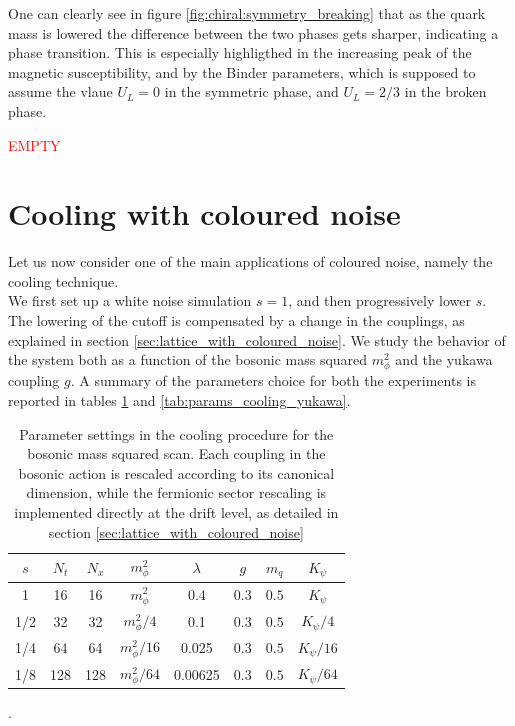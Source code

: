 One can clearly see in figure \ref{fig:chiral:symmetry_breaking} that as the quark  mass is lowered the difference between the two phases gets sharper, indicating a phase transition. 
This is especially highligthed in the increasing peak of the magnetic susceptibility, and by the Binder parameters, which is supposed to assume the vlaue $U_L = 0$ in the symmetric phase, and $U_L=2/3$ in the broken phase.

\newpage
\textcolor{red}{EMPTY}
\newpage

\section{Cooling with coloured noise}
Let us now consider one of the main applications of coloured noise, namely the cooling technique. \\
We first set up a white noise simulation $s=1$, and then progressively lower $s$. The lowering of the cutoff is compensated by a change in the couplings, as explained in section \ref{sec:lattice_with_coloured_noise}. 
We study the behavior of the system both as a function of the bosonic mass squared $m_\phi^2$ and the yukawa coupling $g$. 
A summary of the parameters choice for both the experiments is reported in tables \ref{tab:params_cooling} and \ref{tab:params_cooling_yukawa}. \\
\begin{table}[htp]
    \centering
    \begin{tabular}{cccccccc}
        \toprule
        $s$ & $N_t$ & $N_x$ & $m_\phi^2$ & $\lambda$ & $g$ & $m_q$& $K_\psi$ \\
        \midrule 
        1 & 16 & 16 & $m_\phi^2$ & 0.4 & 0.3 & $0.5$ & $K_\psi$ \\
        1/2 & 32 & 32 & $m_\phi^2/4$ & 0.1 & 0.3 & $0.5$ & $K_\psi/4$ \\
        1/4 & 64 & 64 & $m_\phi^2/16$ & 0.025 & 0.3 & $0.5$ & $K_\psi/16$ \\
        1/8 & 128 & 128 & $m_\phi^2/64$ & 0.00625 & 0.3 & $0.5$ & $K_\psi/64$ \\
        \bottomrule
    \end{tabular}
    \caption[Parameter settings in the cooling procedure for the Bosonic mass squared scan]{Parameter settings in the cooling procedure for the bosonic mass squared scan. Each coupling in the bosonic action is rescaled according to its canonical dimension, while the fermionic sector rescaling is implemented directly at the drift level, as detailed in section \ref{sec:lattice_with_coloured_noise}}.
    \label{tab:params_cooling}
\end{table}
